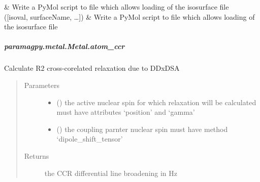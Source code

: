 \documentclass[a4paper,10pt,english,openany,oneside]{sphinxmanual}
\begin{document}
\begin{fulllineitems}
\begin{fulllineitems}
\begin{savenotes}
\begin{longtable}{}
&
Write a PyMol script to file which allows loading of the isosurface file
\\
\hline
{\hyperref[\detokenize{reference/generated/paramagpy.metal.Metal.write_pymol_script:paramagpy.metal.Metal.write_pymol_script}]{}}({[}isoval, surfaceName, …{]})
&
Write a PyMol script to file which allows loading of the isosurface file
\\
\hline
\end{longtable}\sphinxatlongtableend\end{savenotes}


\subparagraph{paramagpy.metal.Metal.atom\_ccr}
\label{\detokenize{reference/generated/paramagpy.metal.Metal.atom_ccr:paramagpy-metal-metal-atom-ccr}}\label{\detokenize{reference/generated/paramagpy.metal.Metal.atom_ccr::doc}}

\begin{fulllineitems}
\label{\detokenize{reference/generated/paramagpy.metal.Metal.atom_ccr:paramagpy.metal.Metal.atom_ccr}}
Calculate R2 cross-corelated relaxation due to DDxDSA
\begin{quote}\begin{description}
\item[{Parameters}] \leavevmode\begin{itemize}
\item {} 
 ({\hyperref[\detokenize{reference/generated/paramagpy.protein.CustomAtom:paramagpy.protein.CustomAtom}]{}}) \textendash{} the active nuclear spin for which relaxation will be calculated
must have attributes ‘position’ and ‘gamma’

\item {} 
 ({\hyperref[\detokenize{reference/generated/paramagpy.protein.CustomAtom:paramagpy.protein.CustomAtom}]{}}) \textendash{} the coupling parnter nuclear spin
must have method ‘dipole\_shift\_tensor’

\end{itemize}

\item[{Returns}] \leavevmode
{} \textendash{} the CCR differential line broadening in Hz


\end{description}
\end{quote}
\end{fulllineitems}
\end{fulllineitems}
\end{fulllineitems}
\end{document}
